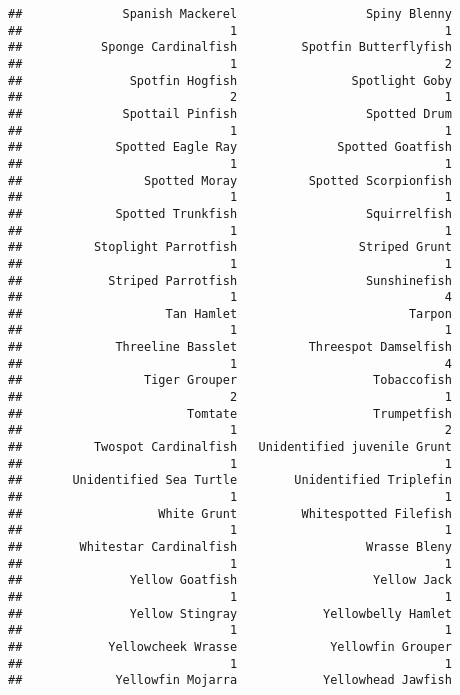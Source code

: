 \documentclass[
]{article}
\begin{document}
\begin{verbatim}
##              Spanish Mackerel                  Spiny Blenny 
##                             1                             1 
##           Sponge Cardinalfish         Spotfin Butterflyfish 
##                             1                             2 
##               Spotfin Hogfish                Spotlight Goby 
##                             2                             1 
##              Spottail Pinfish                  Spotted Drum 
##                             1                             1 
##             Spotted Eagle Ray              Spotted Goatfish 
##                             1                             1 
##                 Spotted Moray          Spotted Scorpionfish 
##                             1                             1 
##             Spotted Trunkfish                  Squirrelfish 
##                             1                             1 
##          Stoplight Parrotfish                 Striped Grunt 
##                             1                             1 
##            Striped Parrotfish                  Sunshinefish 
##                             1                             4 
##                    Tan Hamlet                        Tarpon 
##                             1                             1 
##             Threeline Basslet          Threespot Damselfish 
##                             1                             4 
##                 Tiger Grouper                   Tobaccofish 
##                             2                             1 
##                       Tomtate                   Trumpetfish 
##                             1                             2 
##          Twospot Cardinalfish   Unidentified juvenile Grunt 
##                             1                             1 
##       Unidentified Sea Turtle        Unidentified Triplefin 
##                             1                             1 
##                   White Grunt         Whitespotted Filefish 
##                             1                             1 
##        Whitestar Cardinalfish                  Wrasse Bleny 
##                             1                             1 
##               Yellow Goatfish                   Yellow Jack 
##                             1                             1 
##               Yellow Stingray            Yellowbelly Hamlet 
##                             1                             1 
##            Yellowcheek Wrasse             Yellowfin Grouper 
##                             1                             1 
##             Yellowfin Mojarra            Yellowhead Jawfish 

\end{verbatim}
\end{document}
